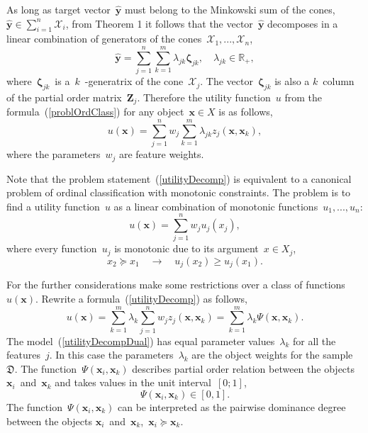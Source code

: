 \documentclass[12pt,preprint]{elsarticle}
\newcommand{\bx}{\mathbf{x}}
\newcommand{\by}{\mathbf{y}}
\newcommand{\bZ}{\mathbf{Z}}
\newcommand{\bzeta}{\boldsymbol{\zeta}}
\begin{document}
As long as target vector~$\hat{\by}$ must belong to the Minkowski sum of the cones,~$\hat{\by}\in \sum\limits_{i=1}^n\mathcal{X}_i$, from Theorem 1 it follows that the vector~$\hat{\by}$ decomposes in a linear combination of generators of the cones~$\mathcal{X}_1,...,\mathcal{X}_n$,
\[
\hat{\by}=\sum\limits_{j=1}^n\sum\limits_{k=1}^m\lambda_{jk}\bzeta_{jk},\quad \lambda_{jk}\in\mathbb{R}_+,
\]
where~$\bzeta_{jk}$~is a~$k$~-generatrix of the cone~$\mathcal{X}_j$. The vector~$\bzeta_{jk}$ is also a $k$~column of the partial order matrix~$\bZ_j$.
Therefore the utility function~$u$ from the formula~(\ref{problOrdClass}) for any object~$\bx\in X$ is as follows,
\begin{equation}
u(\bx) = \sum\limits_{j=1}^n w_j \sum\limits_{k=1}^m\lambda_{jk}z_j(\bx, \bx_k),
\label{utilityDecomp}
\end{equation}
where the parameters~$w_j$ are feature weights.

Note that the problem statement~(\ref{utilityDecomp}) is equivalent to a canonical problem of ordinal classification with monotonic constraints. The problem is to find a utility function~$u$ as a linear combination of monotonic functions~$u_1,...,u_n$:
\begin{equation}
u(\bx)=\sum\limits_{j=1}^n w_j u_j(x_j),
\label{problLinearMon}
\end{equation}
where every function~$u_j$ is monotonic due to its argument~$x\in X_j$,
\begin{equation}
x_2 \succeq x_1 \quad\rightarrow\quad u_j(x_2) \geq u_j(x_1).
\label{condMon}
\end{equation}

For the further considerations make some restrictions over a class of functions~$u(\bx)$.
Rewrite a formula~(\ref{utilityDecomp}) as follows,
\begin{equation}
u(\bx) = \sum\limits_{k=1}^m \lambda_{k} \sum\limits_{j=1}^n w_j z_j(\bx, \bx_k) = \sum\limits_{k=1}^m \lambda_{k} \Psi(\bx, \bx_k).
\label{utilityDecompDual}
\end{equation}
The model~(\ref{utilityDecompDual}) has equal parameter values~$\lambda_k$ for all the features~$j$. In this case the parameters~$\lambda_k$ are the object weights for the sample~$\mathfrak{D}$.
The function~$\Psi(\bx_i, \bx_k)$ describes partial order relation between the objects~$\bx_i$~and~$\bx_k$ and takes values in the unit interval~$[0;1]$,
\[
\Psi(\bx_i, \bx_k)\in[0,1].
\]
The function~$\Psi(\bx_i, \bx_k)$ can be interpreted as the pairwise dominance degree between the objects $\bx_i$~and~$\bx_k$,~$\bx_i\succeq\bx_k$.
\end{document}
